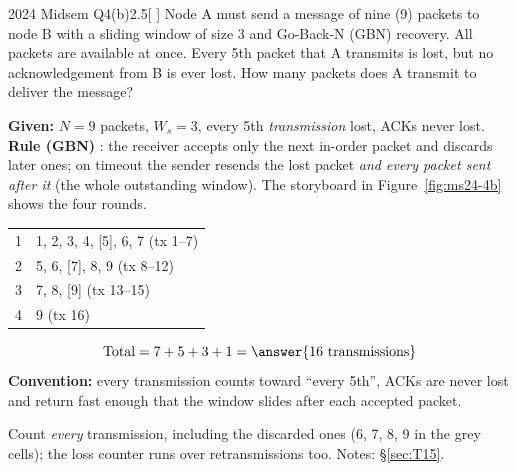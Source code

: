 \begin{question}{2024 Midsem Q4(b)}{2.5}[ ]
Node A must send a message of nine (9) packets to node B with a sliding window of size 3 and Go-Back-N (GBN) recovery. All packets are available at once. Every 5th packet that A transmits is lost, but no acknowledgement from B is ever lost. How many packets does A transmit to deliver the message?
\end{question}
\label{q:MS2024-4b}
\begin{solution}
\textbf{Given:} $N=9$ packets, $W_s=3$, every 5th \emph{transmission} lost, ACKs never lost.\\
\textbf{Rule (GBN)} : the receiver accepts only the next in-order packet and discards later ones; on timeout the sender resends the lost packet \emph{and every packet sent after it} (the whole outstanding window).
The storyboard in Figure~\ref{fig:ms24-4b} shows the four rounds.
\begin{tabularx}{\linewidth}{L{22mm}Y}\toprule
{} & \\ & 1, 2, 3, 4, [5], 6, 7 \quad (tx 1--7)\\
2 & 5, 6, [7], 8, 9 \quad (tx 8--12)\\
3 & 7, 8, [9] \quad (tx 13--15)\\
4 & 9 \quad (tx 16)\\\bottomrule
\end{tabularx}
\[
  \text{Total} = 7+5+3+1 = \answer{16 \text{ transmissions}}
\]
\textbf{Convention:} every transmission counts toward ``every 5th'', ACKs are never lost and return fast enough that the window slides after each accepted packet.
\end{solution}
\begin{warningbox}Count \emph{every} transmission, including the discarded ones (6, 7, 8, 9 in the grey cells); the loss counter runs over retransmissions too. Notes: \S\ref{sec:T15}.\end{warningbox}
